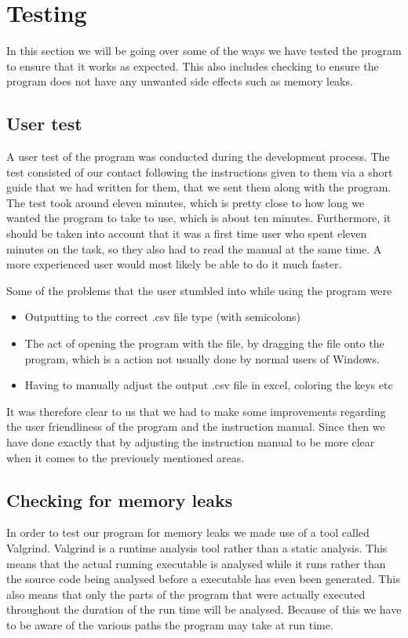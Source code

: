 \section{Testing}
In this section we will be going over some of the ways we have tested the program to ensure that it works as expected. This also includes checking to ensure the program does not have any unwanted side effects such as memory leaks.

\subsection{User test}
A user test of the program was conducted during the development process. The test consisted of our \siemens contact following the instructions given to them via a short guide that we had written for them, that we sent them along with the program. The test took around eleven minutes, which is pretty close to how long we wanted the program to take to use, which is about ten minutes. Furthermore, it should be taken into account that it was a first time user who spent eleven minutes on the task, so they also had to read the manual at the same time. A more experienced user would most likely be able to do it much faster.

Some of the problems that the user stumbled into while using the program were
\begin{itemize}
    \item Outputting to the correct .csv file type (with semicolons)
    \item The act of opening the program with the file, by dragging the file onto the program, which is a action not usually done by normal users of Windows.
    \item Having to manually adjust the output .csv file in excel, coloring the keys etc
\end{itemize}

It was therefore clear to us that we had to make some improvements regarding the user friendliness of the program and the instruction manual. Since then we have done exactly that by adjusting the instruction manual to be more clear when it comes to the previously mentioned areas.

\subsection{Checking for memory leaks}
In order to test our program for memory leaks we made use of a tool called Valgrind. Valgrind is a runtime analysis tool rather than a static analysis. This means that the actual running executable is analysed while it runs rather than the source code being analysed before a executable has even been generated. This also means that only the parts of the program that were actually executed throughout the duration of the run time will be analysed. Because of this we have to be aware of the various paths the program may take at run time.

